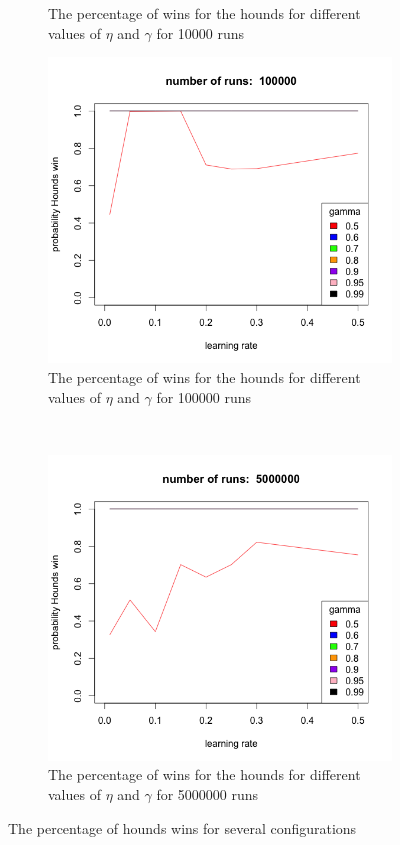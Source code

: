 \begin{figure}[bt]
\begin{subfigure}{0.49\textwidth}
        \caption{The percentage of wins for the hounds for different values
            of $\eta$ and $\gamma$ for 10000 runs}
        \label{fig:r10000}
    \end{subfigure}
    
    \begin{subfigure}{0.49\textwidth}
        \includegraphics[width=\textwidth]{r100000}
        \caption{The percentage of wins for the hounds for different values
            of $\eta$ and $\gamma$ for 100000 runs}
        \label{fig:r100000}
    \end{subfigure}
    ~
    \begin{subfigure}{0.49\textwidth}
        \includegraphics[width=\textwidth]{r5000000}
        \caption{The percentage of wins for the hounds for different values
            of $\eta$ and $\gamma$ for 5000000 runs}
        \label{fig:r5000000}
    \end{subfigure}
    \caption{The percentage of hounds wins for several configurations}
    \label{fig:dat}
\end{figure}

